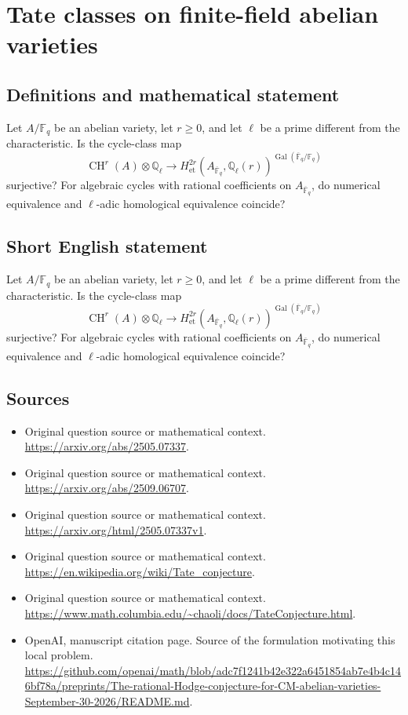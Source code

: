 \documentclass[11pt]{article}
\begin{document}
\section*{Tate classes on finite-field abelian varieties}\label{30007070}
\subsection{Definitions and mathematical statement}
Let $A/\mathbb F_q$ be an abelian variety, let $r\geq0$, and let $\ell$ be a prime different from the characteristic. Is the cycle-class map
\[\operatorname{CH}^r(A)\otimes\mathbb Q_\ell\longrightarrow H_{\mathrm{et}}^{2r}(A_{\overline{\mathbb F}_q},\mathbb Q_\ell(r))^{\operatorname{Gal}(\overline{\mathbb F}_q/\mathbb F_q)}\]
surjective? For algebraic cycles with rational coefficients on $A_{\overline{\mathbb F}_q}$, do numerical equivalence and $\ell$-adic homological equivalence coincide?
\subsection{Short English statement}
Let $A/\mathbb F_q$ be an abelian variety, let $r\geq0$, and let $\ell$ be a prime different from the characteristic. Is the cycle-class map
\[\operatorname{CH}^r(A)\otimes\mathbb Q_\ell\longrightarrow H_{\mathrm{et}}^{2r}(A_{\overline{\mathbb F}_q},\mathbb Q_\ell(r))^{\operatorname{Gal}(\overline{\mathbb F}_q/\mathbb F_q)}\]
surjective? For algebraic cycles with rational coefficients on $A_{\overline{\mathbb F}_q}$, do numerical equivalence and $\ell$-adic homological equivalence coincide?
\subsection{Sources}
\begin{itemize}
\item[S1] Original question source or mathematical context.
\url{https://arxiv.org/abs/2505.07337}.
\item[S2] Original question source or mathematical context.
\url{https://arxiv.org/abs/2509.06707}.
\item[S3] Original question source or mathematical context.
\url{https://arxiv.org/html/2505.07337v1}.
\item[S4] Original question source or mathematical context.
\url{https://en.wikipedia.org/wiki/Tate_conjecture}.
\item[S5] Original question source or mathematical context.
\url{https://www.math.columbia.edu/~chaoli/docs/TateConjecture.html}.
\item[S6] OpenAI, manuscript citation page. Source of the formulation motivating this local problem.
\url{https://github.com/openai/math/blob/adc7f1241b42e322a6451854ab7e4b4c146bf78a/preprints/The-rational-Hodge-conjecture-for-CM-abelian-varieties-September-30-2026/README.md}.
\end{itemize}
\end{document}
